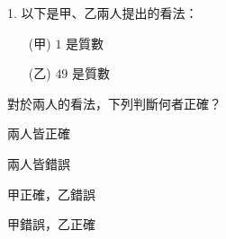 \documentclass[12pt]{article}
\begin{document}
\begin{problem}
  \item[1.] 以下是甲、乙兩人提出的看法：
  \begin{enumerate}
    \item[(甲)] $1$ 是質數
    \item[(乙)] $49$ 是質數
  \end{enumerate}
  對於兩人的看法，下列判斷何者正確？
  \begin{choices}
    \item 兩人皆正確
    \item 兩人皆錯誤
    \item 甲正確，乙錯誤
    \item 甲錯誤，乙正確
  \end{choices}
\end{problem}
\end{document}
